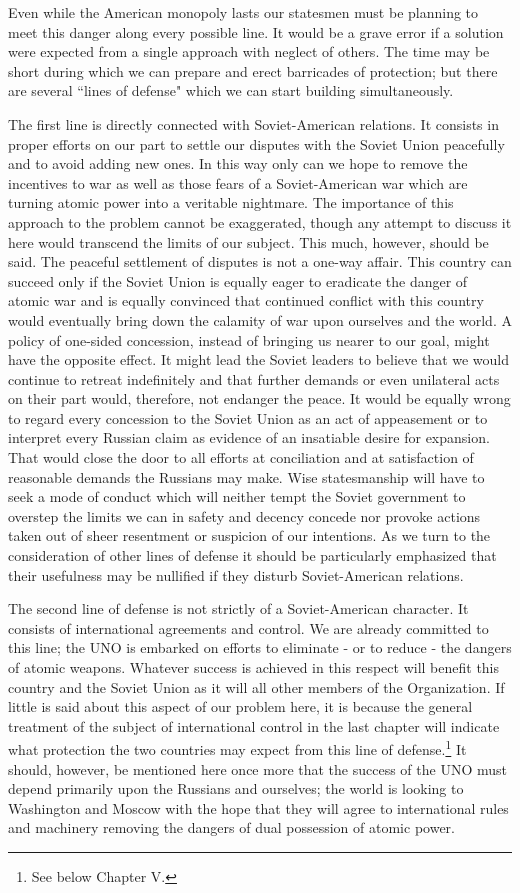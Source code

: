 Even while the American monopoly lasts our statesmen must be planning to meet this danger along every possible line. It would be a grave error if a solution were expected from a single approach with neglect of others. The time may be short during which we can prepare and erect barricades of protection; but there are several ``lines of defense" which we can start building simultaneously.

The first line is directly connected with Soviet-American relations. It consists in proper efforts on our part to settle our disputes with the Soviet Union peacefully and to avoid adding new ones. In this way only can we hope to remove the incentives to war as well as those fears of a Soviet-American war which are turning atomic power into a veritable nightmare. The importance of this approach to the problem cannot be exaggerated, though any attempt to discuss it here would transcend the limits of our subject. This much, however, should be said. The peaceful settlement of disputes is not a one-way affair. This country
can succeed only if the Soviet Union is equally eager to eradicate the danger of atomic war and is equally convinced that continued conflict with this country would eventually bring down the calamity of war upon ourselves and the world. A policy of one-sided concession, instead of bringing us nearer to our goal, might have the opposite effect. It might lead the Soviet leaders to believe that we would continue to retreat indefinitely and that further demands or even unilateral acts on their part would, therefore, not endanger the peace. It would be equally wrong to regard every concession to the Soviet Union as an act of appeasement or to interpret every Russian claim as evidence of an insatiable desire for expansion. That would close the door to all efforts at conciliation and at satisfaction of reasonable demands the Russians may make. Wise statesmanship will have to seek a mode of conduct which will neither tempt the Soviet government to overstep the limits we can in safety and decency concede nor provoke actions taken out of sheer resentment or suspicion of our intentions. As we turn to the consideration of other lines of defense it should be particularly emphasized that their usefulness may be nullified if they disturb Soviet-American relations.

The second line of defense is not strictly of a Soviet-American character. It consists of international agreements and control. We are already committed to this line; the UNO is embarked on efforts to eliminate - or to reduce - the dangers of atomic weapons. Whatever success is achieved in this respect will benefit this country and the Soviet Union as it will all other members of the Organization. If little is said about this aspect of our problem here, it is because the general treatment of the subject of international control in the last chapter will indicate what protection the two countries may expect from this line of defense.\footnote{See below Chapter V.} It should, however, be mentioned here once more that the success of the UNO must depend primarily upon the Russians and ourselves; the world is looking to Washington and Moscow with the hope that they will agree to international rules and machinery removing the dangers of dual possession of atomic power.

